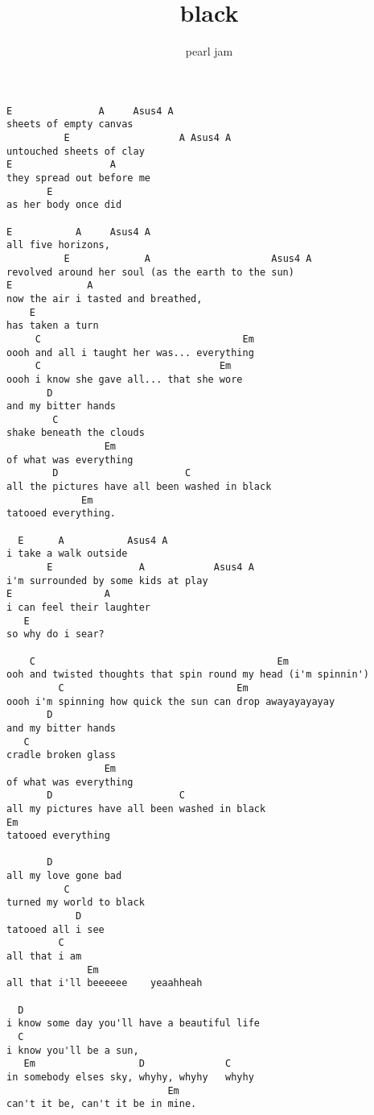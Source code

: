 \author{pearl jam}
\title{black}
\maketitle
\begin{verbatim}
E               A     Asus4 A
sheets of empty canvas
          E                   A Asus4 A
untouched sheets of clay
E                 A
they spread out before me
       E
as her body once did

E           A     Asus4 A
all five horizons,
          E             A                     Asus4 A
revolved around her soul (as the earth to the sun)
E             A
now the air i tasted and breathed,
    E
has taken a turn
     C                                   Em
oooh and all i taught her was... everything
     C                               Em
oooh i know she gave all... that she wore
       D
and my bitter hands
        C
shake beneath the clouds
                 Em
of what was everything
        D                      C
all the pictures have all been washed in black
             Em
tatooed everything.

  E      A           Asus4 A
i take a walk outside
       E               A            Asus4 A
i'm surrounded by some kids at play
E                A
i can feel their laughter
   E
so why do i sear?

    C                                          Em
ooh and twisted thoughts that spin round my head (i'm spinnin')
         C                              Em
oooh i'm spinning how quick the sun can drop awayayayayay
       D
and my bitter hands
   C
cradle broken glass
                 Em
of what was everything
       D                      C
all my pictures have all been washed in black
Em
tatooed everything

       D
all my love gone bad
          C
turned my world to black
            D
tatooed all i see
         C
all that i am
              Em
all that i'll beeeeee    yeaahheah

  D
i know some day you'll have a beautiful life
  C
i know you'll be a sun,
   Em                  D              C
in somebody elses sky, whyhy, whyhy   whyhy
                            Em
can't it be, can't it be in mine.
\end{verbatim}
